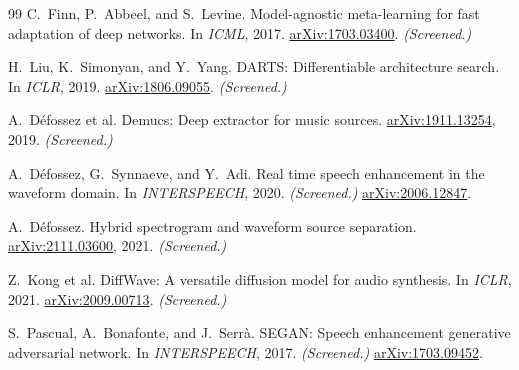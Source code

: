 \documentclass[10pt,twocolumn,letterpaper]{article}
\theoremstyle{remark}
\begin{document}
{\begin{thebibliography}{99}
C.~Finn, P.~Abbeel, and S.~Levine.
\newblock Model-agnostic meta-learning for fast adaptation of deep networks.
\newblock In \emph{ICML}, 2017.
\newblock \href{https://arxiv.org/abs/1703.03400}{arXiv:1703.03400}. \textit{(Screened.)}

H.~Liu, K.~Simonyan, and Y.~Yang.
\newblock DARTS: Differentiable architecture search.
\newblock In \emph{ICLR}, 2019.
\newblock \href{https://arxiv.org/abs/1806.09055}{arXiv:1806.09055}. \textit{(Screened.)}

A.~D\'efossez et al.
\newblock Demucs: Deep extractor for music sources.
\newblock \href{https://arxiv.org/abs/1911.13254}{arXiv:1911.13254}, 2019. \textit{(Screened.)}

A.~D\'efossez, G.~Synnaeve, and Y.~Adi.
\newblock Real time speech enhancement in the waveform domain.
\newblock In \emph{INTERSPEECH}, 2020. \textit{(Screened.)}
\newblock \href{https://arxiv.org/abs/2006.12847}{arXiv:2006.12847}.

A.~D\'efossez.
\newblock Hybrid spectrogram and waveform source separation.
\newblock \href{https://arxiv.org/abs/2111.03600}{arXiv:2111.03600}, 2021. \textit{(Screened.)}

Z.~Kong et al.
\newblock DiffWave: A versatile diffusion model for audio synthesis.
\newblock In \emph{ICLR}, 2021.
\newblock \href{https://arxiv.org/abs/2009.00713}{arXiv:2009.00713}. \textit{(Screened.)}

S.~Pascual, A.~Bonafonte, and J.~Serr\`a.
\newblock SEGAN: Speech enhancement generative adversarial network.
\newblock In \emph{INTERSPEECH}, 2017. \textit{(Screened.)}
\newblock \href{https://arxiv.org/abs/1703.09452}{arXiv:1703.09452}.

\end{thebibliography}
}
\end{document}
